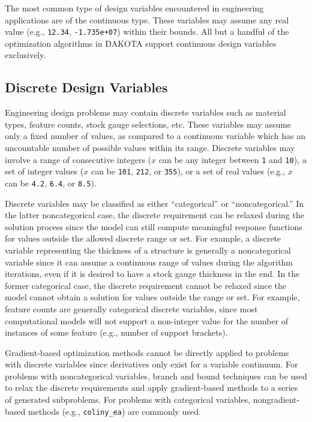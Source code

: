 The most common type of design variables encountered in engineering
applications are of the continuous type. These variables may assume
any real value (e.g., \texttt{12.34}, \texttt{-1.735e+07}) within
their bounds. All but a handful of the optimization algorithms in
DAKOTA support continuous design variables exclusively.

\subsection{Discrete Design Variables}\label{variables:design:ddv}

Engineering design problems may contain discrete variables such as
material types, feature counts, stock gauge selections, etc. These
variables may assume only a fixed number of values, as compared to
a continuous variable which has an uncountable number of possible 
values within its range.  Discrete variables may involve a range 
of consecutive integers ($x$ can be any integer between 
\texttt{1} and \texttt{10}), a set of integer values ($x$ can 
be \texttt{101}, \texttt{212}, or \texttt{355}), or a set of real 
values (e.g., $x$ can be \texttt{4.2}, \texttt{6.4}, or \texttt{8.5}).

Discrete variables may be classified as either ``categorical'' or
``noncategorical.''  In the latter noncategorical case, the discrete
requirement can be relaxed during the solution process since the model
can still compute meaningful response functions for values outside the
allowed discrete range or set. For example, a discrete variable
representing the thickness of a structure is generally a
noncategorical variable since it can assume a continuous range of
values during the algorithm iterations, even if it is desired to have
a stock gauge thickness in the end. In the former categorical case,
the discrete requirement cannot be relaxed since the model cannot
obtain a solution for values outside the range or set. For example,
feature counts are generally categorical discrete variables, since
most computational models will not support a non-integer value for the
number of instances of some feature (e.g., number of support brackets).

Gradient-based optimization methods cannot be directly applied to
problems with discrete variables since derivatives only exist for a
variable continuum. For problems with noncategorical variables, branch
and bound techniques can be used to relax the discrete requirements
and apply gradient-based methods to a series of generated
subproblems. For problems with categorical variables,
nongradient-based methods (e.g., \texttt{coliny\_ea}) are commonly
used. 

